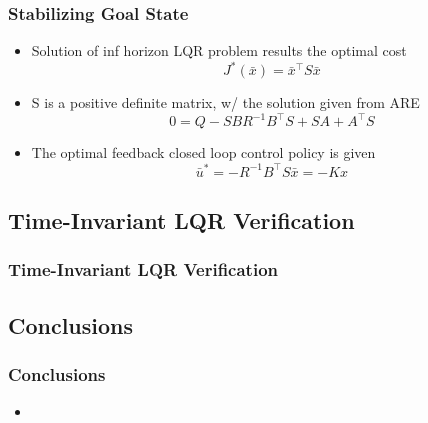 \documentclass{beamer}
\begin{document}

\begin{frame}
\frametitle{Stabilizing Goal State}
\begin{itemize}
\item Solution of inf horizon LQR problem results the optimal cost
\begin{equation*}
J^{\ast}(\bar{x})=\bar{x}^{\intercal}S\bar{x}
\end{equation*} 
\item S is a positive definite matrix, w/ the solution given from ARE
\begin{equation*}
0=Q-SBR^{-1}B^{\intercal}S+SA+A^{\intercal}S
\end{equation*}
\item The optimal feedback closed loop control policy is given
\begin{equation*}
\bar{u}^{\ast}=-R^{-1}B^{\intercal}S\bar{x}=-Kx
\end{equation*}
\end{itemize}
\end{frame}


\subsection{Time-Invariant LQR Verification}

\begin{frame}
\frametitle{Time-Invariant LQR Verification}

\end{frame}










\subsection{Conclusions}
\begin{frame}
\frametitle{Conclusions}

\begin{itemize}
\item 
\end{itemize}
\end{frame}
\end{document}
